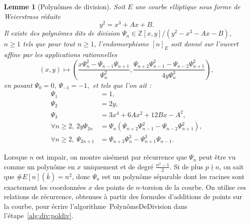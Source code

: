 \documentclass[11pt,a4paper]{article}
\newcommand{\Z}{\mathbb{Z}}
\newcommand{\F}{\mathbb{F}}
\renewcommand{\v}{\vspace{5mm}}
\newtheorem*{lem}{Lemme}
\theoremstyle{definition}
\begin{document}
\begin{lem}[Polynômes de division]
Soit $E$ une courbe elliptique sous forme de Weierstrass réduite
$$y^2 = x^3 + Ax + B.$$
Il existe des polynômes dits \emph{de division} $\Psi_n \in \Z[x,y]/(y^2 - x^3 - Ax - B)$, $n\geq 1$ tels que pour tout $n\geq 1$, l'endomorphisme $[n]_E$ soit donné sur l'ouvert affine par les applications rationnelles
$$(x,y) \longmapsto \left(\frac{x\Psi_n^2 - \Psi_{n-1}\Psi_{n+1}}{\Psi_n^2},
\frac{\Psi_{n+2}\Psi_{n-1}^2 - \Psi_{n-2} \Psi_{n+1}^2}{4y \Psi_n^3}\right),$$
en posant $\Psi_0 = 0,\ \Psi_{-1} = -1,$ et tels que l'on ait :
$$\begin{aligned}
 \Psi_1&= 1,\\
 \Psi_2&= 2y,\\
 \Psi_3&= 3x^4 + 6Ax^2 + 12Bx - A^2, \\
 \forall n\geq 2,\ 2y\Psi_{2n} &= \Psi_n(\Psi_{n+2}\Psi_{n-1}^2 - \Psi_{n-2} \Psi_{n+1}^2), \\
\forall n\geq 2 ,\ \Psi_{2n+1} &= \Psi_{n+2}\Psi_n^3 - \Psi_{n+1}^3\Psi_{n-1}.
\end{aligned}$$
\end{lem}

Lorsque $n$ est impair, on montre aisément par récurrence que $\Psi_n$ peut être vu comme un polynôme en $x$ uniquement et de degré $\frac{n^2-1}{2}$. Si de plus $p\nmid n$, on sait que $\#E[n](\bar{k})=n^2$, donc $\Psi_n$ est un polynôme séparable dont les racines sont exactement les coordonnées $x$ des points de $n$-torsion de la courbe. 
On utilise ces relations de récurrence, obtenues à partir des formules d'additions de points sur la courbe, pour écrire l'algorithme~{\sc PolynômeDeDivision} dans l'étape~\ref{alg:div:poldiv}.
\v
\end{document}
